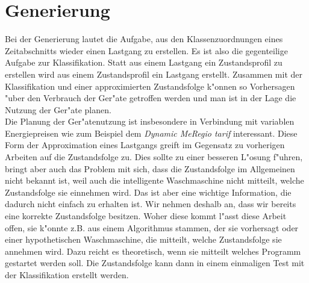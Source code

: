 \section{Generierung}
\label{Generierung}
Bei der Generierung lautet die Aufgabe, aus den Klassenzuordnungen eines Zeitabschnitts wieder einen Lastgang zu erstellen. Es ist also die gegenteilige Aufgabe zur Klassifikation. Statt aus einem Lastgang ein Zustandsprofil zu erstellen wird aus einem Zustandsprofil ein Lastgang erstellt.
Zusammen mit der Klassifikation und einer approximierten Zustandsfolge k"onnen so Vorhersagen "uber den Verbrauch der Ger"ate getroffen werden und man ist in der Lage die Nutzung der Ger"ate planen. \\
Die Planung der Ger"atenutzung ist insbesondere in Verbindung mit variablen Energiepreisen wie zum Beispiel dem \textit{Dynamic MeRegio tarif}\cite{FreyEnBW} interessant. Diese Form der Approximation eines Lastgangs greift im Gegensatz zu vorherigen Arbeiten auf die Zustandsfolge zu. Dies sollte zu einer besseren L"osung f"uhren, bringt aber auch das Problem mit sich, dass die Zustandsfolge im Allgemeinen nicht bekannt ist, weil auch die intelligente Waschmaschine nicht mitteilt, welche Zustandsfolge sie einnehmen wird. Das ist aber eine wichtige Information, die dadurch nicht einfach zu erhalten ist. Wir nehmen deshalb an, dass wir bereits eine korrekte Zustandsfolge besitzen. Woher diese kommt l"asst diese Arbeit offen, sie k"onnte z.B. aus einem Algorithmus stammen, der sie vorhersagt oder einer hypothetischen Waschmaschine, die mitteilt, welche Zustandsfolge sie annehmen wird. Dazu reicht es theoretisch, wenn sie mitteilt welches Programm gestartet werden soll. Die Zustandsfolge kann dann in einem einmaligen Test mit der Klassifikation erstellt werden.

